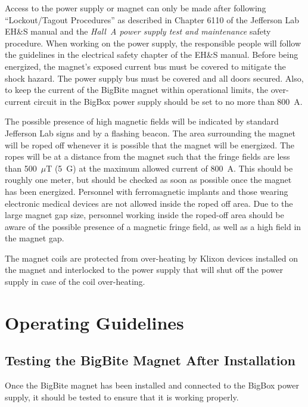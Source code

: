 Access to the power supply or magnet can only be made after following
``Lockout/Tagout Procedures'' 
as described in Chapter 6110 of the Jefferson Lab EH\&S manual and the {\it{Hall~A power
supply test and maintenance}} safety procedure.  
When working on
the power supply, the responsible people will follow the guidelines in the 
electrical safety chapter of the EH\&S manual.  
Before being energized, the magnet's exposed current bus must be covered
to mitigate the shock hazard.
The power supply bus must be covered and all doors secured.
Also, to keep the current of the BigBite magnet within operational limits, 
the over-current circuit in the BigBox power supply should be set to
no more than 800~A.  

The possible presence of high magnetic fields will be 
indicated by standard Jefferson Lab signs and by a 
flashing beacon.  The area surrounding the magnet will be 
roped off whenever it is possible that the magnet
will be energized.  The ropes will be at a distance from the 
magnet such that the fringe fields are less than
500~{$\mu$}T (5~G) at the maximum allowed current of 800~A.  
This should be roughly one meter, but should be checked as soon as
possible once the magnet has been energized.  Personnel with ferromagnetic 
implants and those wearing 
electronic medical devices are not allowed inside the roped off area.  
Due to the large magnet gap size, personnel
working inside the roped-off area should be aware of the possible presence of a magnetic fringe field, as well as
a high field in the magnet gap.  

The magnet coils are protected from over-heating by 
Klixon devices installed on the magnet and interlocked to the power supply that will shut off the
power supply in case of the coil over-heating.

\section{Operating Guidelines}


\subsection{Testing the BigBite Magnet After Installation}
\label{guideline-commissioning}

Once the BigBite magnet has been installed and connected to the BigBox power supply, it should be
tested to ensure that it is working properly.  

